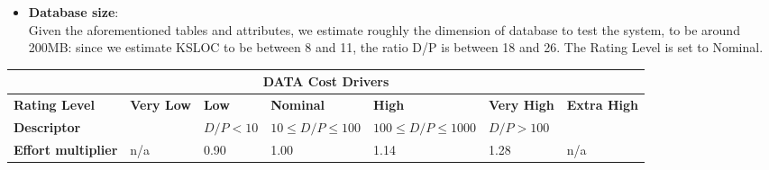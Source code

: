\begin{itemize}
\item \textbf{Database size}:\\
Given the aforementioned tables and attributes, we estimate roughly the dimension of database to test the system, to be around 200MB: since we estimate KSLOC to be between 8 and 11, the ratio D/P is between 18 and 26. The Rating Level is set to Nominal.
\end{itemize}
\hspace*{-3cm}\begin{tabular}{|p{3cm}|p{2cm}|p{2cm}|p{2cm}|p{2cm}|p{2cm}|p{2cm}|}
\hline
\multicolumn{7}{|c|}{\textbf{DATA Cost Drivers}}\\
\hline
\hline
\textbf{Rating Level} & \textbf{Very Low} & \textbf{Low} & \textbf{Nominal} & \textbf{High} & \textbf{Very High} & \textbf{Extra High}\\
\hline
\textbf{Descriptor} & & $D/P < 10$ & $10 \leq D/P \leq 100$ & $100 \leq D/P \leq 1000$ & $ D/P > 100$ & \\
\hline
\textbf{Effort multiplier} & n/a & 0.90 & 1.00 & 1.14 & 1.28 & n/a\\
\hline 
\end{tabular}